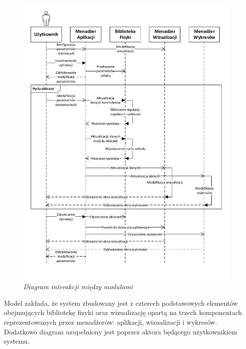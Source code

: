 \documentclass[12pt, oneside]{report}
\theoremstyle{definition}
\begin{document}
\begin{figure}[H]
	\centering
		\includegraphics[width = 400pt]{Interaction} 
		\caption{\textit{Diagram interakcji między modułami}}
		\label{Interaction}
\end{figure}

Model zakłada, że system zbudowany jest z czterech podstawowych elementów obejmujących bibliotekę fizyki oraz wizualizację opartą na trzech komponentach reprezentowanych przez menadżerów: aplikacji, wizualizacji i wykresów. Dodatkowo diagram uzupełniony jest poprzez aktora będącego użytkownikiem systemu. 
\end{document}
